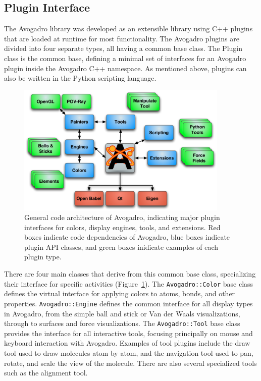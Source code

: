 \documentclass[10pt]{bmc_article}
\newenvironment{bmcformat}{\begin{raggedright}
\baselineskip20pt\sloppy\setboolean{publ}{false}}{\end{raggedright}
\baselineskip20pt\sloppy}
\begin{document}
\begin{bmcformat}
\subsection{Plugin Interface}

The Avogadro library was developed as an extensible library using C++ plugins
that are loaded at runtime for most functionality. The Avogadro plugins are
divided into four separate types, all having a common base class. The Plugin
class is the common base, defining a minimal set of interfaces for an Avogadro
plugin inside the Avogadro C++ namespace. As mentioned above, plugins
can also be written in the Python scripting language.

\begin{figure}
  \includegraphics[width=0.9\textwidth]{images/architecture}
  \caption{General code architecture of Avogadro, indicating major
    plugin interfaces for colors, display engines, tools, and
    extensions. Red boxes indicate code dependencies of Avogadro, blue
  boxes indicate plugin API classes, and green boxes inidicate examples of
  each plugin type.}
 \label{f:architecture}
\end{figure}

There are four main classes that derive from this common base class, specializing
their interface for specific activities
(Figure~\ref{f:architecture}). The {\tt Avogadro::Color} base class
defines the virtual interface for applying colors to atoms, bonds, and other properties.
 {\tt Avogadro::Engine} defines the common interface for all display types in Avogadro,
from the simple ball and stick or Van der Waals visualizations, through to
surfaces and force visualizations. The {\tt Avogadro::Tool} base class provides
the interface for all interactive tools, focusing principally on mouse and
keyboard interaction with Avogadro. Examples of tool plugins include the draw
tool used to draw molecules atom by atom, and the navigation tool used to pan,
rotate, and scale the view of the molecule. There are also several specialized
tools such as the alignment tool.


\end{bmcformat}
\end{document}
